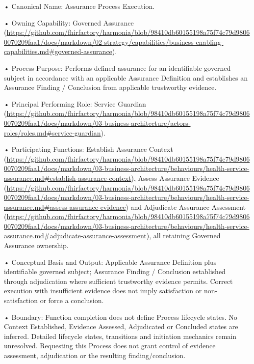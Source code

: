 •
Canonical Name: Assurance Process Execution.



•
Owning Capability: Governed Assurance (\url{https://github.com/fhirfactory/harmonia/blob/98410db60155198a75f74c79d98060070209faa1/docs/markdown/02-strategy/capabilities/business-enabling-capabilities.md#governed-assurance}).



•
Process Purpose: Performs defined assurance for an identifiable governed subject in accordance with an applicable Assurance Definition and establishes an Assurance Finding / Conclusion from applicable trustworthy evidence.



•
Principal Performing Role: Service Guardian (\url{https://github.com/fhirfactory/harmonia/blob/98410db60155198a75f74c79d98060070209faa1/docs/markdown/03-business-architecture/actors-roles/roles.md#service-guardian}).



•
Participating Functions: Establish Assurance Context (\url{https://github.com/fhirfactory/harmonia/blob/98410db60155198a75f74c79d98060070209faa1/docs/markdown/03-business-architecture/behaviours/health-service-assurance.md#establish-assurance-context}), Assess Assurance Evidence (\url{https://github.com/fhirfactory/harmonia/blob/98410db60155198a75f74c79d98060070209faa1/docs/markdown/03-business-architecture/behaviours/health-service-assurance.md#assess-assurance-evidence}) and Adjudicate Assurance Assessment (\url{https://github.com/fhirfactory/harmonia/blob/98410db60155198a75f74c79d98060070209faa1/docs/markdown/03-business-architecture/behaviours/health-service-assurance.md#adjudicate-assurance-assessment}), all retaining Governed Assurance ownership.



•
Conceptual Basis and Output: Applicable Assurance Definition plus identifiable governed subject; Assurance Finding / Conclusion established through adjudication where sufficient trustworthy evidence permits. Correct execution with insufficient evidence does not imply satisfaction or non-satisfaction or force a conclusion.



•
Boundary: Function completion does not define Process lifecycle states. No Context Established, Evidence Assessed, Adjudicated or Concluded states are inferred. Detailed lifecycle states, transitions and initiation mechanics remain unresolved. Requesting this Process does not grant control of evidence assessment, adjudication or the resulting finding/conclusion.



